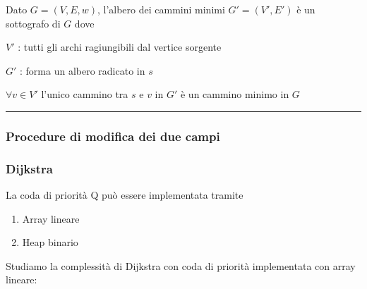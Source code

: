 \documentclass{article}
\providecommand{\tightlist}{%
  \setlength{\itemsep}{0pt}\setlength{\parskip}{0pt}}
\begin{document}
{{{{Dato $G=(V,E,w)$, l'albero dei cammini minimi $G'=(V',E')$ è un sottografo di $G$ dove}

{$V'$ : tutti gli archi ragiungibili dal vertice sorgente}

{$G'$ : forma un albero radicato in $s$}

{$\forall v \in V'$ l'unico cammino tra $s$ e $v$ in $G'$ è un cammino minimo in $G$}

\begin{center}\rule{0.5\linewidth}{\linethickness}\end{center}

\subsubsection{\texorpdfstring{{}}{}}\label{h.h4dk3zmkq25w}

\subsubsection{\texorpdfstring{{Procedure di modifica dei due campi}}{Procedure di modifica dei due campi}}\label{h.5lg4kz3z4f5y}

\protect\hypertarget{t.29f77ac6905498186484b14fa7bf14ea64fecb79}{}{}\protect\hypertarget{t.46}{}{}



\protect\hypertarget{t.4fa4368bfb7c1d485140ed33f86edf6c298bfda0}{}{}\protect\hypertarget{t.47}{}{}



\subsubsection{\texorpdfstring{{Dijkstra}}{Dijkstra}}\label{h.d7e75pwi333b}

\protect\hypertarget{t.d055ffe7c1698902badd9b7488033a931b1cfb1d}{}{}\protect\hypertarget{t.48}{}{}




{La coda di priorità Q può essere implementata tramite}

\begin{enumerate}
\tightlist
\item
  {Array lineare}
\item
  {Heap binario}
\end{enumerate}

{Studiamo la complessità di Dijkstra con coda di priorità implementata con array lineare:}




}}}
\end{document}

